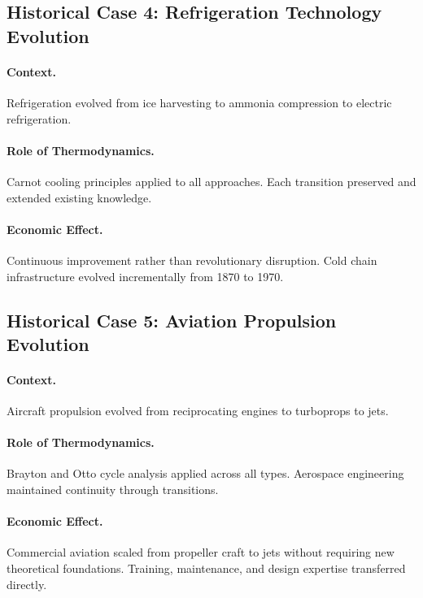\subsection{Historical Case 4: Refrigeration Technology Evolution}

\paragraph{Context.} Refrigeration evolved from ice harvesting to ammonia
compression to electric refrigeration.

\paragraph{Role of Thermodynamics.} Carnot cooling principles applied to all
approaches. Each transition preserved and extended existing knowledge.

\paragraph{Economic Effect.} Continuous improvement rather than revolutionary
disruption. Cold chain infrastructure evolved incrementally from 1870 to 1970.

\subsection{Historical Case 5: Aviation Propulsion Evolution}

\paragraph{Context.} Aircraft propulsion evolved from reciprocating engines
to turboprops to jets.

\paragraph{Role of Thermodynamics.} Brayton and Otto cycle analysis applied
across all types. Aerospace engineering maintained continuity through
transitions.

\paragraph{Economic Effect.} Commercial aviation scaled from propeller craft
to jets without requiring new theoretical foundations. Training, maintenance,
and design expertise transferred directly.


